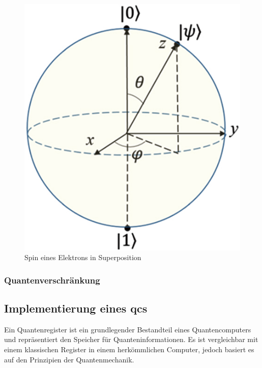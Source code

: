 \begin{figure}[!hbt]
    \centering
    \includegraphics{./images/spin-superpostition.jpg}
    \caption{Spin eines Elektrons in Superposition \cite{noauthor_cpb_27_9_090308_f8jpg_nodate}}
    \label{fig:spin}
\end{figure}

\subsubsection{Quantenverschränkung}


\subsection{Implementierung eines \ac{qc}s}



Ein Quantenregister ist ein grundlegender Bestandteil eines Quantencomputers und repräsentiert den Speicher für Quanteninformationen. Es ist vergleichbar mit einem klassischen Register in einem herkömmlichen Computer, jedoch basiert es auf den Prinzipien der Quantenmechanik.

